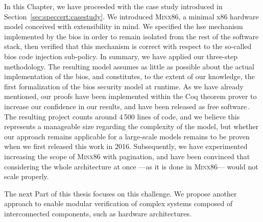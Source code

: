 In this Chapter, we have proceeded with the case study introduced in
Section~\ref{sec:speccert:casestudy}.
%
We introduced {\scshape Minx86}, a minimal x86 hardware model conceived with
extensibility in mind.
%
We specified the \ac{hse} mechanism implemented by the \ac{bios} in order to
remain isolated from the rest of the software stack, then verified that this
mechanism is correct with respect to the so-called \ac{bios} code injection
sub-policy.
%
In summary, we have applied our three-step methodology.
%
The resulting model assumes as little as possible about the actual
implementation of the \ac{bios}, and constitutes, to the extent of our
knowledge, the first formalization of the \ac{bios} security model at runtime.
%
As we have already mentioned, our proofs have been implemented within the Coq
theorem prover to increase our confidence in our results, and have been released
as free software\,\cite{letan2016speccertcode}.
%
The resulting project counts around 4\,500 lines of code, and we believe this
represents a manageable size regarding the complexity of the model, but whether
our approach remains applicable for a large-scale models remains to be proven
when we first released this work in 2016.
%
Subsequently, we have experimented increasing the scope of {\scshape Minx86}
with pagination, and have been convinced that considering the whole architecture
at once ---as it is done in {\scshape Minx86}--- would not scale properly.

The next Part of this thesis focuses on this challenge.
%
We propose another approach to enable modular verification of complex systems
composed of interconnected components, such as hardware architectures.

